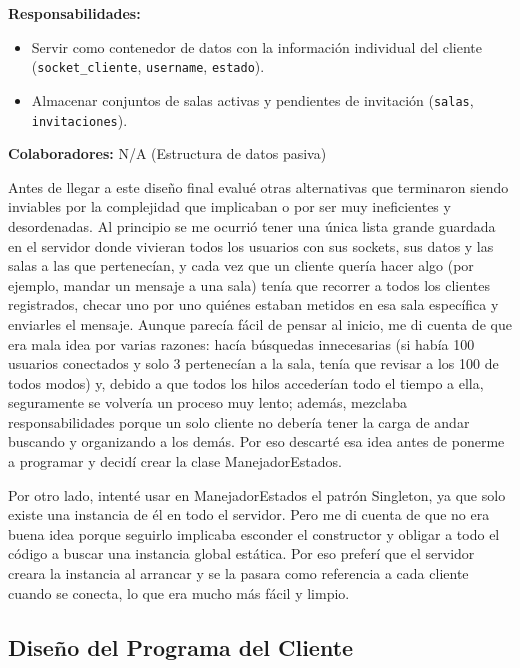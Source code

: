 \documentclass[11pt,a4paper]{article}
\begin{document}
\begin{tcolorbox}[colback=white,colframe=black,title=\textbf{Tarjeta CRC: Struct datosCliente}, fonttitle=\bfseries]
\textbf{Responsabilidades:}
\begin{itemize}
    \item Servir como contenedor de datos con la información individual del cliente (\texttt{socket\_cliente}, \texttt{username}, \texttt{estado}).
    \item Almacenar conjuntos de salas activas y pendientes de invitación (\texttt{salas}, \texttt{invitaciones}).
\end{itemize}
\tcblower
\textbf{Colaboradores:} N/A (Estructura de datos pasiva)
\end{tcolorbox}

Antes de llegar a este diseño final evalué otras alternativas que terminaron siendo inviables por la complejidad que implicaban o por ser muy ineficientes y desordenadas. Al principio se me ocurrió tener una única lista grande guardada en el servidor donde vivieran todos los usuarios con sus sockets, sus datos y las salas a las que pertenecían, y cada vez que un cliente quería hacer algo (por ejemplo, mandar un mensaje a una sala) tenía que recorrer a todos los clientes registrados, checar uno por uno quiénes estaban metidos en esa sala específica y enviarles el mensaje. Aunque parecía fácil de pensar al inicio, me di cuenta de que era mala idea por varias razones: hacía búsquedas innecesarias (si había 100 usuarios conectados y solo 3 pertenecían a la sala, tenía que revisar a los 100 de todos modos) y, debido a que todos los hilos accederían todo el tiempo a ella, seguramente se volvería un proceso muy lento; además, mezclaba responsabilidades porque un solo cliente no debería tener la carga de andar buscando y organizando a los demás. Por eso descarté esa idea antes de ponerme a programar y decidí crear la clase ManejadorEstados.

Por otro lado, intenté usar en ManejadorEstados el patrón Singleton, ya que solo existe una instancia de él en todo el servidor. Pero me di cuenta de que no era buena idea porque seguirlo implicaba esconder el constructor y obligar a todo el código a buscar una instancia global estática. Por eso preferí que el servidor creara la instancia al arrancar y se la pasara como referencia a cada cliente cuando se conecta, lo que era mucho más fácil y limpio.

\subsection{Diseño del Programa del Cliente}
\end{document}
